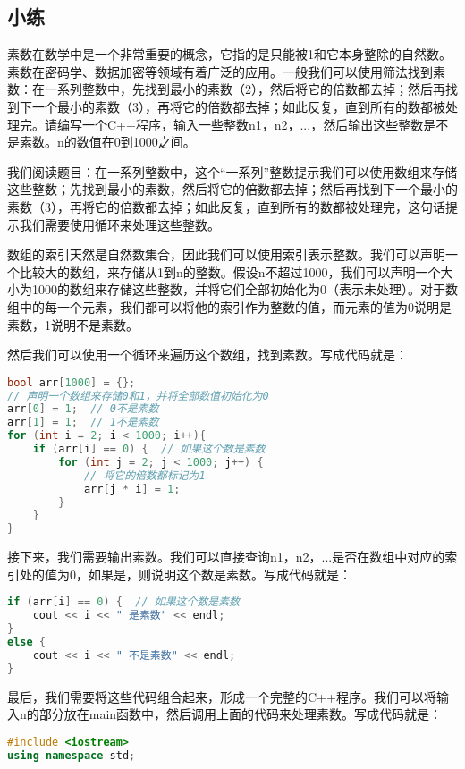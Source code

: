 \subsection{小练}

\begin{example}
  素数在数学中是一个非常重要的概念，它指的是只能被1和它本身整除的自然数。素数在密码学、数据加密等领域有着广泛的应用。一般我们可以使用筛法找到素数：在一系列整数中，先找到最小的素数（2），然后将它的倍数都去掉；然后再找到下一个最小的素数（3），再将它的倍数都去掉；如此反复，直到所有的数都被处理完。请编写一个C++程序，输入一些整数n1，n2，...，然后输出这些整数是不是素数。n的数值在0到1000之间。
\end{example}

\begin{answer}
  我们阅读题目：在一系列整数中，这个“一系列”整数提示我们可以使用数组来存储这些整数；先找到最小的素数，然后将它的倍数都去掉；然后再找到下一个最小的素数（3），再将它的倍数都去掉；如此反复，直到所有的数都被处理完，这句话提示我们需要使用循环来处理这些整数。

  数组的索引天然是自然数集合，因此我们可以使用索引表示整数。我们可以声明一个比较大的数组，来存储从1到n的整数。假设n不超过1000，我们可以声明一个大小为1000的数组来存储这些整数，并将它们全部初始化为0（表示未处理）。对于数组中的每一个元素，我们都可以将他的索引作为整数的值，而元素的值为0说明是素数，1说明不是素数。

  然后我们可以使用一个循环来遍历这个数组，找到素数。写成代码就是：
\begin{lstlisting}[language=C++]
bool arr[1000] = {};
// 声明一个数组来存储0和1，并将全部数值初始化为0
arr[0] = 1;  // 0不是素数
arr[1] = 1;  // 1不是素数
for (int i = 2; i < 1000; i++){
    if (arr[i] == 0) {  // 如果这个数是素数
        for (int j = 2; j < 1000; j++) {
            // 将它的倍数都标记为1
            arr[j * i] = 1;
        }
    }
}
\end{lstlisting}

  接下来，我们需要输出素数。我们可以直接查询n1，n2，...是否在数组中对应的索引处的值为0，如果是，则说明这个数是素数。写成代码就是：
\begin{lstlisting}[language=C++]
if (arr[i] == 0) {  // 如果这个数是素数
    cout << i << " 是素数" << endl;
}
else {
    cout << i << " 不是素数" << endl;
}
\end{lstlisting}
  最后，我们需要将这些代码组合起来，形成一个完整的C++程序。我们可以将输入n的部分放在main函数中，然后调用上面的代码来处理素数。写成代码就是：
\begin{lstlisting}[language=C++]
#include <iostream>
using namespace std;


\end{lstlisting}
\end{answer}
